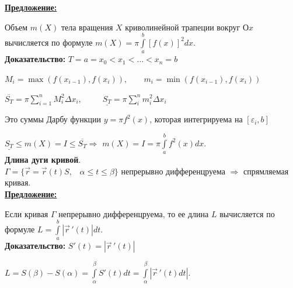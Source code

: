 \documentclass[a4paper,12pt]{article} %
\begin{document}
\underline{\textbf{Предложение:}}

Объем $m(X)$ тела вращения $X$ криволинейной трапеции вокруг $Оx$ вычисляется по формуле $m(X) = \pi \int\limits_a^b[f(x)]^2dx$.\\

\textbf{Доказательство:} $T={a=x_0<x_1<\dots<x_n = b}$

$M_i = \max (f(x_{i-1}), f(x_i)), \;\;\;\;\;\;\; m_i=\min (f(x_{i-1}), f(x_i))$

$\overline{S_T} = \pi \sum\limits_{i=1}^n M_i^2 \Delta x_i, \;\;\;\;\;\;\;\;\; \underline{S_T} = \pi \sum\limits_i^n m_i^2 \Delta x_i$

Это суммы Дарбу функции $y = \pi f^2(x)$, которая интегрируема на $[\varepsilon_i, b]$

$\underline{S_T} \leq m(X) = I \leq \overline{S_T} \Rightarrow$ $m(X) = I = \pi \int\limits_a^b f^2(x)dx$.\\

\noindent \textbf{Длина дуги кривой}.\\

$\Gamma = \{\Vec{r} = \Vec{r}(t)S,\;\;\; \alpha \leq t \leq \beta\}$ непрерывно дифференцруема $\Rightarrow$ спрямляемая кривая.\\

\underline{\textbf{Предложение:}}

Если кривая $\Gamma$ непрерывно дифференцруема, то ее длина $L$ вычисляется по формуле $L=\int\limits_a^b |\Vec{r}\,'(t)|dt$.\\

\textbf{Доказательство:} $S'(t)=|\Vec{r}\,'(t)|$

$L = S(\beta) - S(\alpha) = \int \limits_{\alpha}^{\beta} S'(t)dt = \int \limits_{\alpha}^{\beta} |\Vec{r}\,'(t) dt|$.
\end{document}
